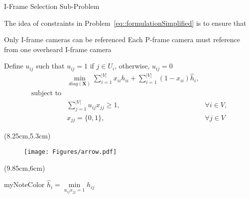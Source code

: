 \begin{frame}{I-Frame Selection Sub-Problem}
\begin{itemize}
	\myItem The idea of constraints in Problem~\eqref{eq::formulationSimplified} is to ensure that
	\begin{itemize}
		\mySubItem Only I-frame cameras can be referenced
		\mySubItem Each P-frame camera must reference from one overheard I-frame camera
	\end{itemize}
	\myItem Define $u_{ij}$ such that $u_{ij} = 1$ if $j \in U_i$, otherwise, $u_{ij} = 0$
	{\small \begin{align}
		&\underset{diag(\mathbf{X})}{\min} \sum_{i=1}^{|V|} x_{ii}h_{ii} + \sum_{i=1}^{|V|} (1-x_{ii}) \hat{h}_i, & \nonumber \\
		\text{subject to} & & \nonumber \\
		&\sum_{j=1}^{|V|} u_{ij} x_{jj} \geq 1, &\forall i \in V, \nonumber \\
		&x_{jj} = \{0,1\}, &\forall j \in V  
		\label{eq::IframeSelectionSubProblem}
	\end{align} }%
\end{itemize}
%
\begin{textblock*}{2.6cm}(8.25cm,5.3cm)
\begin{figure}
\centering
\texttt{[image: Figures/arrow.pdf]}
\end{figure}
\end{textblock*}
%
\begin{textblock*}{2.6cm}(9.85cm,6cm)
\begin{beamercolorbox}[center,shadow=true,rounded=true]{myNoteColor}
{\small $\hat{h}_i = \underset{u_{ij}x_{jj} = 1}{\min} h_{ij}$ }
\end{beamercolorbox}
\end{textblock*}
%
\end{frame}